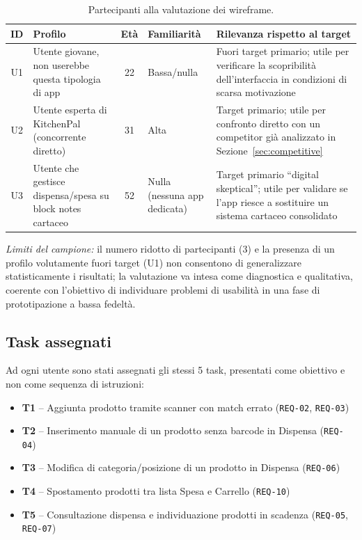 \documentclass[11pt,a4paper]{article}
\begin{document}
\begin{table}[H]
\centering
\small
\renewcommand{\arraystretch}{1.3}
\begin{tabularx}{\textwidth}{c >{\raggedright\arraybackslash}p{3.6cm} c >{\raggedright\arraybackslash}p{3cm} >{\raggedright\arraybackslash}X}
\toprule
\textbf{ID} & \textbf{Profilo} & \textbf{Età} & \textbf{Familiarità} & \textbf{Rilevanza rispetto al target} \\
\midrule
U1 & Utente giovane, non userebbe questa tipologia di app & 22 & Bassa/nulla & Fuori target primario; utile per verificare la scopribilità dell'interfaccia in condizioni di scarsa motivazione \\ \addlinespace[0.4em]
U2 & Utente esperta di KitchenPal (concorrente diretto) & 31 & Alta & Target primario; utile per confronto diretto con un competitor già analizzato in Sezione~\ref{sec:competitive} \\ \addlinespace[0.4em]
U3 & Utente che gestisce dispensa/spesa su block notes cartaceo & 52 & Nulla (nessuna app dedicata) & Target primario ``digital skeptical''; utile per validare se l'app riesce a sostituire un sistema cartaceo consolidato \\
\bottomrule
\end{tabularx}
\caption{Partecipanti alla valutazione dei wireframe.}
\label{tab:eval_users}
\end{table}

\textit{Limiti del campione:} il numero ridotto di partecipanti (3) e la presenza di un profilo volutamente fuori target (U1) non consentono di generalizzare statisticamente i risultati; la valutazione va intesa come diagnostica e qualitativa, coerente con l'obiettivo di individuare problemi di usabilità in una fase di prototipazione a bassa fedeltà.

\subsection{Task assegnati}
Ad ogni utente sono stati assegnati gli stessi 5 task, presentati come obiettivo e non come sequenza di istruzioni:
\begin{itemize}
    \item \textbf{T1} -- Aggiunta prodotto tramite scanner con match errato (\texttt{REQ-02}, \texttt{REQ-03})
    \item \textbf{T2} -- Inserimento manuale di un prodotto senza barcode in Dispensa (\texttt{REQ-04})
    \item \textbf{T3} -- Modifica di categoria/posizione di un prodotto in Dispensa (\texttt{REQ-06})
    \item \textbf{T4} -- Spostamento prodotti tra lista Spesa e Carrello (\texttt{REQ-10})
    \item \textbf{T5} -- Consultazione dispensa e individuazione prodotti in scadenza (\texttt{REQ-05}, \texttt{REQ-07})
\end{itemize}
\end{document}
